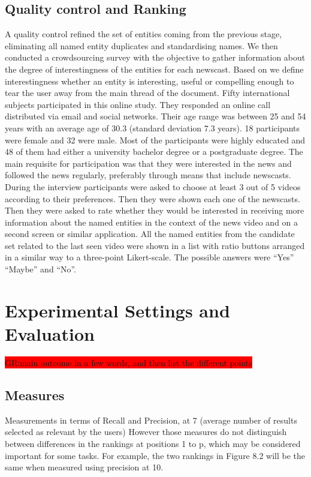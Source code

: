 \documentclass{llncs}
\newcommand{\todo}[1]{\colorbox{red}{#1}}
\begin{document}
\subsection{Quality control and Ranking}
A quality control refined the set of entities coming from the previous stage, eliminating all named entity duplicates and standardising names. 
We then conducted a crowdsourcing survey with the objective to gather information about the degree of interestingness of the entities for each newscast. Based on \cite{vonBrzeski:2007:LCU:1321440.1321537} we define interestingness whether an entity is interesting, useful or compelling enough to tear the user away from the main thread of the document. Fifty international subjects participated in this online study. They responded an online call distributed via email and social networks. Their age range was between 25 and 54 years with an average age of 30.3 (standard deviation 7.3 years). 18 participants were female and 32 were male. Most of the participants were highly educated and 48 of them had either a university bachelor degree or a postgraduate degree. The main requisite for participation was that they were interested in the news and followed the news regularly, preferably through means that include newscasts.
During the interview participants were asked to choose at least 3 out of 5 videos according to their preferences. Then they were shown each one of the newscasts. Then they were asked to rate whether they would be interested in receiving more information about the named entities in the context of the news video and on a second screen or similar application. All the named entities from the candidate set related to the last seen video were shown in a list with ratio buttons arranged in a similar way to a three-point Likert-scale. The possible answers were ``Yes'' ``Maybe'' and ``No''. 

\section{Experimental Settings and Evaluation}
\label{sec:Evaluation}
\todo{GR:main outcome in a few words, and then list the different points}

\subsection{Measures}
Measurements in terms of Recall and Precision, at 7 (average number of results selected as relevant by the users)
However those measures do not distinguish between differences in the rankings at positions 1 to p, which may be considered important for some tasks. For example, the two rankings in Figure 8.2 will be the same when measured using precision at 10.
\end{document}

